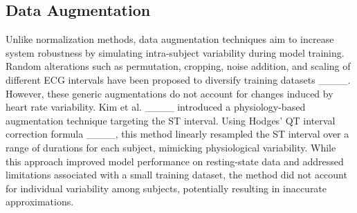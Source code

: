 \subsection{Data Augmentation}
Unlike normalization methods, data augmentation techniques aim to increase system robustness by simulating intra-subject variability during model training.
Random alterations such as permutation, cropping, noise addition, and scaling of different ECG intervals have been proposed to diversify training datasets ____.
However, these generic augmentations do not account for changes induced by heart rate variability.
Kim et al. ____ introduced a physiology-based augmentation technique targeting the ST interval. Using Hodges’ QT interval correction formula ____, this method linearly resampled the ST interval over a range of durations for each subject, mimicking physiological variability.
While this approach improved model performance on resting-state data and addressed limitations associated with a small training dataset, the method did not account for individual variability among subjects, potentially resulting in inaccurate approximations.